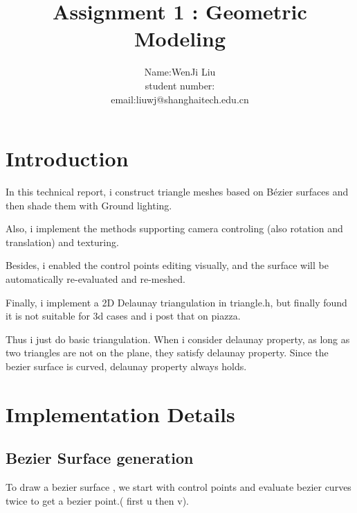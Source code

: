 \documentclass[acmtog]{acmart}
\title{Assignment 1 : Geometric Modeling}
\author{Name:\quad WenJi Liu  \\ student number:\quad 13611756
	\\email:\quad liuwj@shanghaitech.edu.cn}
\begin{document}
\maketitle

\vspace*{2 ex}


\section{Introduction}
 In this technical report, i  construct triangle meshes based on Bézier surfaces and then shade them with Ground lighting. \par Also, i implement the methods supporting camera controling (also rotation and translation) and texturing.
 \par Besides, i enabled the control points editing visually, and the surface will be automatically re-evaluated and re-meshed. 
 \par Finally, i implement a 2D Delaunay triangulation in triangle.h, but finally found it is not suitable for 3d cases and i post that on piazza.
 \par Thus i just do basic triangulation. When i consider delaunay property, as long as two triangles are not on the plane, they satisfy delaunay property. Since the bezier surface is curved, delaunay property always holds.
\section{Implementation Details}
\subsection{Bezier Surface generation}
To draw a bezier surface , we start with control points and evaluate bezier curves twice to get a bezier point.( first u then v).
\end{document}
